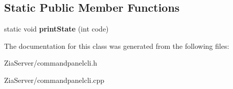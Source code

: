 \subsection*{Static Public Member Functions}
\begin{DoxyCompactItemize}
\item 
\hypertarget{class_command_panel_c_l_i_aa86e91479f29c6d6ad1a7073d8589e5a}{
static void {\bfseries printState} (int code)}
\label{class_command_panel_c_l_i_aa86e91479f29c6d6ad1a7073d8589e5a}

\end{DoxyCompactItemize}


The documentation for this class was generated from the following files:\begin{DoxyCompactItemize}
\item 
ZiaServer/commandpanelcli.h\item 
ZiaServer/commandpanelcli.cpp\end{DoxyCompactItemize}
